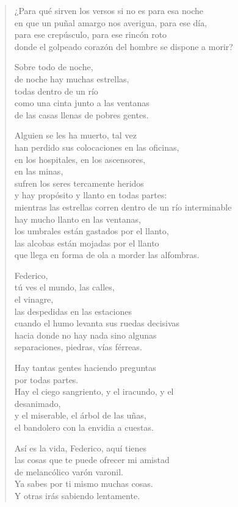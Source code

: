 \documentclass[12pt]{article}
\begin{document}
\begin{verse}
¿Para qué sirven los versos si no es para esa noche\\
en que un puñal amargo nos averigua, para ese día,\\
para ese crepúsculo, para ese rincón roto\\
donde el golpeado corazón del hombre se dispone a morir?  

Sobre todo de noche,\\
de noche hay muchas estrellas,\\
todas dentro de un río\\
como una cinta junto a las ventanas\\
de las casas llenas de pobres gentes.  

Alguien se les ha muerto, tal vez\\
han perdido sus colocaciones en las oficinas,\\
en los hospitales, en los ascensores,\\
en las minas,\\
sufren los seres tercamente heridos\\
y hay propósito y llanto en todas partes:\\
mientras las estrellas corren dentro de un río interminable\\
hay mucho llanto en las ventanas,\\
los umbrales están gastados por el llanto,\\
las alcobas están mojadas por el llanto\\
que llega en forma de ola a morder las alfombras.  

Federico,\\
tú ves el mundo, las calles,\\
el vinagre,\\
las despedidas en las estaciones\\
cuando el humo levanta sus ruedas decisivas\\
hacia donde no hay nada sino algunas\\
separaciones, piedras, vías férreas.  

Hay tantas gentes haciendo preguntas\\
por todas partes.\\
Hay el ciego sangriento, y el iracundo, y el\\
desanimado,\\
y el miserable, el árbol de las uñas,\\
el bandolero con la envidia a cuestas.  

Así es la vida, Federico, aquí tienes\\
las cosas que te puede ofrecer mi amistad\\
de melancólico varón varonil.\\
Ya sabes por ti mismo muchas cosas.\\
Y otras irás sabiendo lentamente.  

\end{verse}
\end{document}

